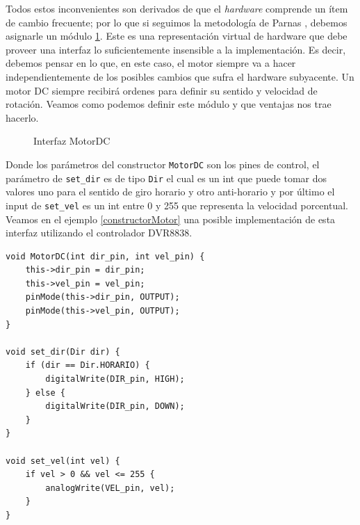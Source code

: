 Todos estos inconvenientes son derivados de que el \textit{hardware} comprende un ítem de cambio frecuente; por lo que si seguimos la metodología de Parnas \cite{Parnas02}, debemos asignarle un módulo \ref{interfazMotor}. Este es una representación virtual de hardware que debe proveer una interfaz lo suficientemente insensible a la implementación. Es decir, debemos pensar en lo que, en este caso, el motor siempre va a hacer independientemente de los posibles cambios que sufra el hardware subyacente. Un motor DC siempre recibirá ordenes para definir su sentido y velocidad de rotación. Veamos como podemos definir este módulo y que ventajas nos trae hacerlo.

\begin{figure}
\caption{Interfaz MotorDC}
\label{interfazMotor}
\begin{center}
\end{center}
\end{figure}

Donde los parámetros del constructor \verb|MotorDC| son los pines de control, el parámetro de \verb|set_dir| es de tipo \verb|Dir| el cual es un int que puede tomar dos valores uno para el sentido de giro horario y otro anti-horario y por último el input de \verb|set_vel| es un int entre 0 y 255 que representa la velocidad porcentual. Veamos en el ejemplo \ref{constructorMotor} una posible implementación de esta interfaz utilizando el controlador DVR8838.

\begin{lstlisting}[caption=Posible implementación de la interfaz del módulo MotorDC,label={constructorMotor}]
void MotorDC(int dir_pin, int vel_pin) {
    this->dir_pin = dir_pin;
    this->vel_pin = vel_pin;
    pinMode(this->dir_pin, OUTPUT);
    pinMode(this->vel_pin, OUTPUT);
}

void set_dir(Dir dir) {
    if (dir == Dir.HORARIO) {
        digitalWrite(DIR_pin, HIGH);
    } else {
        digitalWrite(DIR_pin, DOWN);
    }
}

void set_vel(int vel) {
    if vel > 0 && vel <= 255 {
        analogWrite(VEL_pin, vel);
    }
}
\end{lstlisting}

